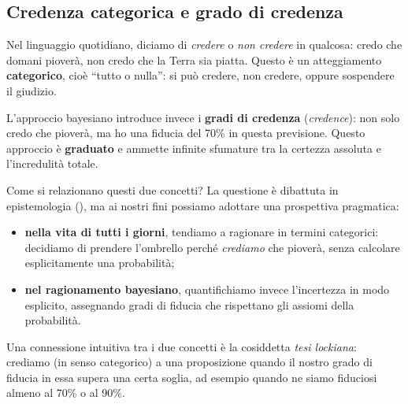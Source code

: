 \documentclass[
  letterpaper,
  DIV=11,
  numbers=noendperiod,
  oneside]{scrreprt}
\providecommand{\tightlist}{%
  \setlength{\itemsep}{0pt}\setlength{\parskip}{0pt}}
\theoremstyle{definition}
\theoremstyle{plain}
\theoremstyle{definition}
\theoremstyle{remark}
\begin{document}
\begin{tcolorbox}[enhanced jigsaw, arc=.35mm, breakable, colbacktitle=quarto-callout-note-color!10!white, opacityback=0, toprule=.15mm, rightrule=.15mm, colback=white, opacitybacktitle=0.6, leftrule=.75mm, coltitle=black, bottomtitle=1mm, left=2mm, toptitle=1mm, title=\textcolor{quarto-callout-note-color}{\faInfo}\hspace{0.5em}{Credere e avere fiducia: due concetti distinti?}, titlerule=0mm, bottomrule=.15mm, colframe=quarto-callout-note-color-frame]

\section*{Credenza categorica e grado di
credenza}\label{credenza-categorica-e-grado-di-credenza}


Nel linguaggio quotidiano, diciamo di \emph{credere} o \emph{non
credere} in qualcosa: credo che domani pioverà, non credo che la Terra
sia piatta. Questo è un atteggiamento \textbf{categorico}, cioè ``tutto
o nulla'': si può credere, non credere, oppure sospendere il giudizio.

L'approccio bayesiano introduce invece i \textbf{gradi di credenza}
(\emph{credence}): non solo credo che pioverà, ma ho una fiducia del
70\% in questa previsione. Questo approccio è \textbf{graduato} e
ammette infinite sfumature tra la certezza assoluta e l'incredulità
totale.

Come si relazionano questi due concetti? La questione è dibattuta in
epistemologia (),
ma ai nostri fini possiamo adottare una prospettiva pragmatica:

\begin{itemize}
\tightlist
\item
  \textbf{nella vita di tutti i giorni}, tendiamo a ragionare in termini
  categorici: decidiamo di prendere l'ombrello perché \emph{crediamo}
  che pioverà, senza calcolare esplicitamente una probabilità;
\item
  \textbf{nel ragionamento bayesiano}, quantifichiamo invece
  l'incertezza in modo esplicito, assegnando gradi di fiducia che
  rispettano gli assiomi della probabilità.
\end{itemize}

Una connessione intuitiva tra i due concetti è la cosiddetta \emph{tesi
lockiana}: crediamo (in senso categorico) a una proposizione quando il
nostro grado di fiducia in essa supera una certa soglia, ad esempio
quando ne siamo fiduciosi almeno al 70\% o al 90\%.


\end{tcolorbox}
\end{document}
